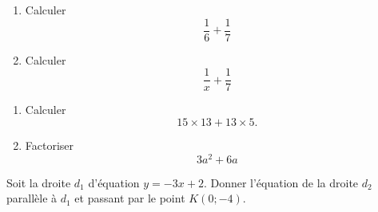 \begin{MentalActivity}

    \begin{mental}
        \begin{enumerate}
            \item
                Calculer
                \begin{equation}
                    \frac{1}{ 6 }+\frac{1}{ 7 }
                \end{equation}
            \item
                Calculer
                \begin{equation}
                    \frac{1}{ x }+\frac{1}{ 7 }
                \end{equation}
        \end{enumerate}
    \end{mental}

    \begin{mental}
        \begin{enumerate}
            \item
                
        Calculer
        \begin{equation}
            15\times 13+13\times 5.
        \end{equation}

    \item
        Factoriser
        \begin{equation}
            3a^2+6a
        \end{equation}

        \end{enumerate}

        
    \end{mental}

    \begin{mental}
        Soit la droite \( d_1\) d'équation \( y=-3x+2\). Donner l'équation de la droite \( d_2\) parallèle à \( d_1\) et passant par le point \( K(0;-4)\).
    \end{mental}

\end{MentalActivity}

